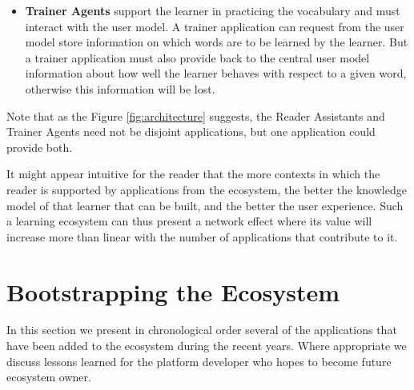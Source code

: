 \documentclass{sig-alternate-05-2015}
\begin{document}
\begin{itemize}
\begin{itemize}
		\end{itemize}


	\item {\bf Trainer Agents} support the learner in practicing the vocabulary and must interact with the user model. A trainer application can request from the user model store information on which words are to be learned by the learner. But a trainer application must also provide back to the central user model information about how well the learner behaves with respect to a given word, otherwise this information will be lost. 
	


	
\end{itemize}

Note that as the Figure \ref{fig:architecture} suggests, the Reader Assistants and Trainer Agents need not be disjoint applications, but one application could provide both.

It might appear intuitive for the reader that the more contexts in which the reader is supported by applications from the ecosystem, the better the knowledge model of that learner that can be built, and the better the user experience. Such a learning ecosystem can thus present a network effect where its value will increase more than linear with the number of applications that contribute to it.




\section {Bootstrapping the Ecosystem}

In this section we present in chronological order several of the applications that have been added to the ecosystem during the recent years. Where appropriate we discuss lessons learned for the platform developer who hopes to become future ecosystem owner. 
\end{document}
